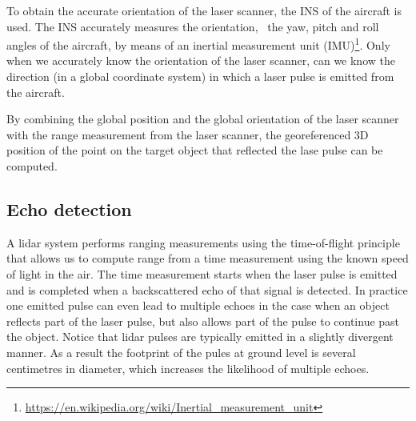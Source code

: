 To obtain the accurate orientation of the laser scanner, the INS of the aircraft is used. 
The INS accurately measures the orientation, \ie\ the yaw, pitch  and roll angles of the aircraft, by means of an inertial measurement unit (IMU)\footnote{\url{https://en.wikipedia.org/wiki/Inertial_measurement_unit}}. 
Only when we accurately know the orientation of the laser scanner, can we know the direction (in a global coordinate system) in which a laser pulse is emitted from the aircraft.

By combining the global position and the global orientation of the laser scanner with the range measurement from the laser scanner, the georeferenced 3D position of  the point  on the target object that reflected the lase pulse can be computed.


\subsection{Echo detection}

A lidar system performs ranging measurements using the time-of-flight principle that allows us to compute range from a time measurement using the known speed of light in the air. 
The time measurement starts when the laser pulse is emitted and is completed when a backscattered echo of that signal is detected. 
In practice one emitted pulse can even lead to multiple echoes  in the case when an object reflects part of the laser pulse, but also allows part of the pulse to continue past the object. 
Notice that lidar pulses are typically emitted in a slightly divergent manner. As a result the footprint of the pules at ground level is several centimetres in diameter, which increases the likelihood of multiple echoes.

